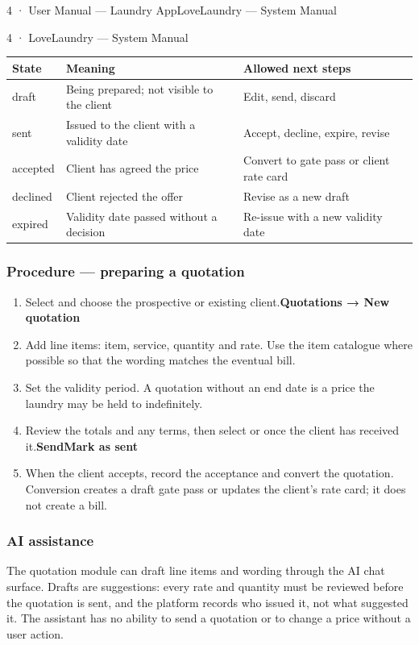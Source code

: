 \documentclass[11pt,a4paper,oneside]{book}
\begin{document}
4 · User Manual — Laundry AppLoveLaundry — System Manual

4 · LoveLaundry — System Manual

\begin{center}\small
\begin{tabularx}{\linewidth}{|X|X|X|}
\hline
\rowcolor{lightgrey}
\textbf{State} & \textbf{Meaning} & \textbf{Allowed next steps} \\ \hline
draft & Being prepared; not visible to the client & Edit, send, discard \\ \hline
sent & Issued to the client with a validity date & Accept, decline, expire, revise \\ \hline
accepted & Client has agreed the price & Convert to gate pass or client rate card \\ \hline
declined & Client rejected the offer & Revise as a new draft \\ \hline
expired & Validity date passed without a decision & Re-issue with a new validity date \\ \hline
\end{tabularx}
\end{center}
\subsubsection*{Procedure — preparing a quotation}
\begin{enumerate}
\item Select  and choose the prospective or existing client.\textbf{Quotations → New quotation}
\item Add line items: item, service, quantity and rate. Use the item catalogue where possible so that the wording matches the eventual bill.
\item Set the validity period. A quotation without an end date is a price the laundry may be held to indefinitely.
\item Review the totals and any terms, then select  or  once the client has received it.\textbf{Send}\textbf{Mark as sent}
\item When the client accepts, record the acceptance and convert the quotation. Conversion creates a draft gate pass or updates the client's rate card; it does not create a bill.
\end{enumerate}
\subsubsection*{AI assistance}
The quotation module can draft line items and wording through the AI chat surface. Drafts are suggestions: every rate and quantity must be reviewed before the quotation is sent, and the platform records who issued it, not what suggested it. The assistant has no ability to send a quotation or to change a price without a user action.
\end{document}
